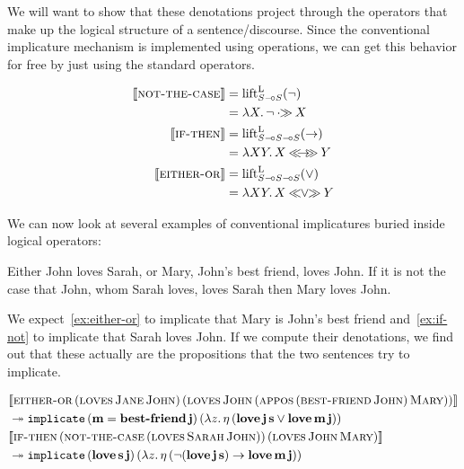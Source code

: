 We will want to show that these denotations project through the operators
that make up the logical structure of a sentence/discourse. Since the
conventional implicature mechanism is implemented using operations, we can
get this behavior for free by just using the standard operators.

\begin{align*}
  \lex{not-the-case}{\liftl_{S \limp S}(\lnot)} \\
  &= \lam{X}{\lnot \apr X} \\
  \lex{if-then}{\liftl_{S \limp S \limp S}(\to)} \\
  &= \lam{X Y}{X \implr Y} \\
  \lex{either-or}{\liftl_{S \limp S \limp S}(\lor)} \\
  &= \lam{X Y}{X \orlr Y}
\end{align*}

We can now look at several examples of conventional implicatures buried
inside logical operators:

\begin{exe}
  \ex Either John loves Sarah, or Mary, John's best friend, loves John. \label{ex:either-or}
  \ex If it is not the case that John, whom Sarah loves, loves Sarah then Mary loves John. \label{ex:if-not}
\end{exe}

We expect~\eqref{ex:either-or} to implicate that Mary is John's best friend
and~\eqref{ex:if-not} to implicate that Sarah loves John. If we compute
their denotations, we find out that these actually are the propositions
that the two sentences try to implicate.

\NoChapterPrefix
\begin{align}
  & \llbracket \textsc{either-or}\,(\textsc{loves}\,\textsc{Jane}\,\textsc{John})\,(\textsc{loves}\,\textsc{John}\,(\textsc{appos}\,(\textsc{best-friend}\,\textsc{John})\,\textsc{Mary})) \rrbracket \nonumber \\
  & \twoheadrightarrow \mathtt{implicate}\,(\textbf{m} = \textbf{best-friend}\,\textbf{j})\,(\lambda z.\, \eta\,(\textbf{love}\,\textbf{j}\,\textbf{s} \lor \textbf{love}\,\textbf{m}\,\textbf{j})) \\
  & \llbracket \textsc{if-then}\,(\textsc{not-the-case}\,(\textsc{loves}\,\textsc{Sarah}\,\textsc{John}))\,(\textsc{loves}\,\textsc{John}\,\textsc{Mary}) \rrbracket \nonumber \\
  & \twoheadrightarrow \mathtt{implicate}\,(\textbf{love}\,\textbf{s}\,\textbf{j})\,(\lambda z.\, \eta\,(\lnot(\textbf{love}\,\textbf{j}\,\textbf{s}) \to \textbf{love}\,\textbf{m}\,\textbf{j}))
\end{align}
\ChapterPrefix

